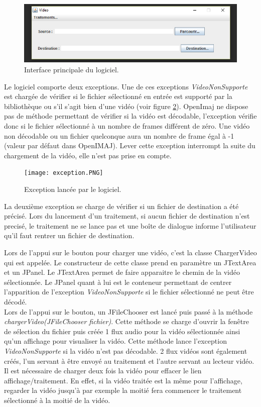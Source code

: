 \documentclass[10pt,a4paper]{article}
\begin{document}
\begin{figure}[!h]
\center
\includegraphics[scale = 0.6]{interface.png}
\caption{Interface principale du logiciel.}
\label{interface}
\end{figure}

Le logiciel comporte deux exceptions. Une de ces exceptions \textit{VideoNonSupporte} est chargée de vérifier si le fichier sélectionné en entrée est supporté par la bibliothèque ou s'il s'agit bien d'une vidéo (voir figure \ref{exception}). OpenImaj ne dispose pas de méthode permettant de vérifier si la vidéo est décodable, l'exception vérifie donc si le fichier sélectionné à un nombre de frames différent de zéro. Une vidéo non décodable ou un fichier quelconque aura un nombre de frame égal à -1 (valeur par défaut dans OpenIMAJ). Lever cette exception interrompt la suite du chargement de la vidéo, elle n'est pas prise en compte.

\begin{figure}[!h]
\center
\texttt{[image: exception.PNG]}
\caption{Exception lancée par le logiciel.}
\label{exception}
\end{figure}

La deuxième exception se charge de vérifier si un fichier de destination a été précisé. Lors du lancement d'un traitement, si aucun fichier de destination n'est precisé, le traitement ne se lance pas et une boîte de dialogue informe l'utilisateur qu'il faut rentrer un fichier de destination.


Lors de l'appui sur le bouton pour charger une vidéo, c'est la classe ChargerVideo qui est appelée.
Le constructeur de cette classe prend en paramètre un JTextArea et un JPanel. Le JTextArea permet de faire apparaitre le chemin de la vidéo sélectionnée. Le JPanel quant à lui est le conteneur permettant de centrer l'apparition de l'exception \textit{VideoNonSupporte} si le fichier sélectionné ne peut être décodé.\\

Lors de l'appui sur le bouton, un JFileChooser est lancé puis passé à la méthode \textit{chargerVideo(JFileChooser fichier)}.
Cette méthode se charge d'ouvrir la fenêtre de sélection du fichier puis créée 1 flux audio pour la vidéo sélectionnée ainsi qu'un affichage pour visualiser la vidéo. Cette méthode lance l'exception \textit{VideoNonSupporte} si la vidéo n'est pas décodable.
2 flux vidéos sont également créés, l'un servant à être envoyé au traitement et l'autre servant au lecteur vidéo. Il est
nécessaire de charger deux fois la vidéo pour effacer le lien affichage/traitement. En effet, si la vidéo traitée est la même pour l'affichage, regarder la vidéo jusqu'à par exemple la moitié fera commencer le traitement sélectionné à la moitié de la vidéo.
\end{document}
